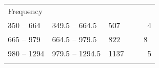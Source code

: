 \documentclass[]{book}
\begin{document}
\begin{longtable}[]{@{}lllll@{}}
\begin{minipage}[t]{0.14\columnwidth}
Frequency\strut
\end{minipage}\tabularnewline
\begin{minipage}[t]{0.18\columnwidth}\raggedright
350 -- 664\strut
\end{minipage} & \begin{minipage}[t]{0.23\columnwidth}\raggedright
349.5 -- 664.5\strut
\end{minipage} & \begin{minipage}[t]{0.13\columnwidth}\raggedright
507\strut
\end{minipage} & \begin{minipage}[t]{0.10\columnwidth}\raggedright
~\strut
\end{minipage} & \begin{minipage}[t]{0.14\columnwidth}\raggedright
~4\strut
\end{minipage}\tabularnewline
\begin{minipage}[t]{0.18\columnwidth}\raggedright
665 -- 979\strut
\end{minipage} & \begin{minipage}[t]{0.23\columnwidth}\raggedright
664.5 -- 979.5\strut
\end{minipage} & \begin{minipage}[t]{0.13\columnwidth}\raggedright
822\strut
\end{minipage} & \begin{minipage}[t]{0.10\columnwidth}\raggedright
\strut
\end{minipage} & \begin{minipage}[t]{0.14\columnwidth}\raggedright
8\strut
\end{minipage}\tabularnewline
\begin{minipage}[t]{0.18\columnwidth}\raggedright
980 -- 1294\strut
\end{minipage} & \begin{minipage}[t]{0.23\columnwidth}\raggedright
979.5 -- 1294.5\strut
\end{minipage} & \begin{minipage}[t]{0.13\columnwidth}\raggedright
1137\strut
\end{minipage} & \begin{minipage}[t]{0.10\columnwidth}\raggedright
~\strut
\end{minipage} & \begin{minipage}[t]{0.14\columnwidth}\raggedright
~5\strut
\end{minipage}\tabularnewline
\begin{minipage}[t]{0.18\columnwidth}\raggedright

\end{minipage}
\end{longtable}
\end{document}
